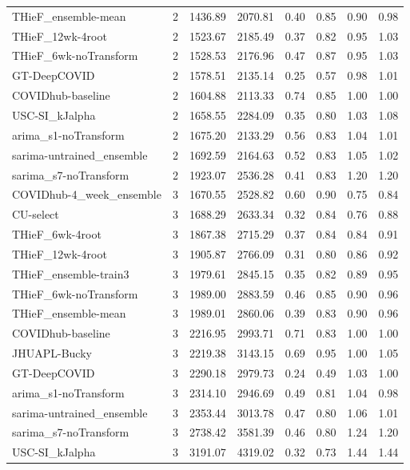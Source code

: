 \documentclass[12pt]{article}
\begin{document}
\begin{longtable}{lrrrrrrr}
  THieF\_ensemble-mean & 2 & 1436.89 & 2070.81 & 0.40 & 0.85 & 0.90 & 0.98 \\ 
  THieF\_12wk-4root & 2 & 1523.67 & 2185.49 & 0.37 & 0.82 & 0.95 & 1.03 \\ 
  THieF\_6wk-noTransform & 2 & 1528.53 & 2176.96 & 0.47 & 0.87 & 0.95 & 1.03 \\ 
  GT-DeepCOVID & 2 & 1578.51 & 2135.14 & 0.25 & 0.57 & 0.98 & 1.01 \\ 
  COVIDhub-baseline & 2 & 1604.88 & 2113.33 & 0.74 & 0.85 & 1.00 & 1.00 \\ 
  USC-SI\_kJalpha & 2 & 1658.55 & 2284.09 & 0.35 & 0.80 & 1.03 & 1.08 \\ 
  arima\_s1-noTransform & 2 & 1675.20 & 2133.29 & 0.56 & 0.83 & 1.04 & 1.01 \\ 
  sarima-untrained\_ensemble & 2 & 1692.59 & 2164.63 & 0.52 & 0.83 & 1.05 & 1.02 \\ 
  sarima\_s7-noTransform & 2 & 1923.07 & 2536.28 & 0.41 & 0.83 & 1.20 & 1.20 \\ 
  COVIDhub-4\_week\_ensemble & 3 & 1670.55 & 2528.82 & 0.60 & 0.90 & 0.75 & 0.84 \\ 
  CU-select & 3 & 1688.29 & 2633.34 & 0.32 & 0.84 & 0.76 & 0.88 \\ 
  THieF\_6wk-4root & 3 & 1867.38 & 2715.29 & 0.37 & 0.84 & 0.84 & 0.91 \\ 
  THieF\_12wk-4root & 3 & 1905.87 & 2766.09 & 0.31 & 0.80 & 0.86 & 0.92 \\ 
  THieF\_ensemble-train3 & 3 & 1979.61 & 2845.15 & 0.35 & 0.82 & 0.89 & 0.95 \\ 
  THieF\_6wk-noTransform & 3 & 1989.00 & 2883.59 & 0.46 & 0.85 & 0.90 & 0.96 \\ 
  THieF\_ensemble-mean & 3 & 1989.01 & 2860.06 & 0.39 & 0.83 & 0.90 & 0.96 \\ 
  COVIDhub-baseline & 3 & 2216.95 & 2993.71 & 0.71 & 0.83 & 1.00 & 1.00 \\ 
  JHUAPL-Bucky & 3 & 2219.38 & 3143.15 & 0.69 & 0.95 & 1.00 & 1.05 \\ 
  GT-DeepCOVID & 3 & 2290.18 & 2979.73 & 0.24 & 0.49 & 1.03 & 1.00 \\ 
  arima\_s1-noTransform & 3 & 2314.10 & 2946.69 & 0.49 & 0.81 & 1.04 & 0.98 \\ 
  sarima-untrained\_ensemble & 3 & 2353.44 & 3013.78 & 0.47 & 0.80 & 1.06 & 1.01 \\ 
  sarima\_s7-noTransform & 3 & 2738.42 & 3581.39 & 0.46 & 0.80 & 1.24 & 1.20 \\ 
  USC-SI\_kJalpha & 3 & 3191.07 & 4319.02 & 0.32 & 0.73 & 1.44 & 1.44 \\ 

\end{longtable}
\end{document}
